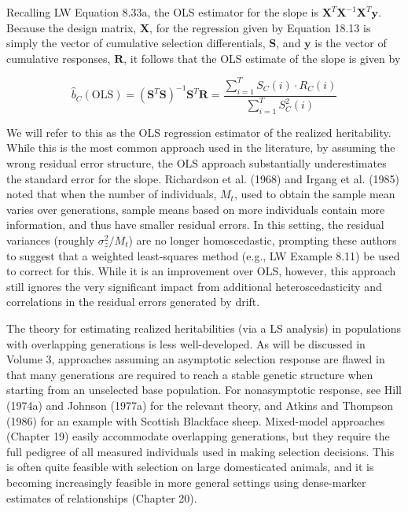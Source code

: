 \documentclass{article}
\begin{document}
Recalling LW Equation 8.33a, the OLS estimator for the slope is  $ \mathbf{X}^T\mathbf{X}^{-1}\mathbf{X}^T\mathbf{y} $. Because the design matrix,  $ \mathbf{X} $, for the regression given by Equation 18.13 is simply the vector of cumulative selection differentials,  $ \mathbf{S} $, and  $ \mathbf{y} $ is the vector of cumulative responses,  $ \mathbf{R} $, it follows that the OLS estimate of the slope is given by

\begin{equation}
\widehat{b}_{C}(\mathrm{OLS})=\left(\mathbf{S}^{T}\mathbf{S}\right)^{-1}\mathbf{S}^{T}\mathbf{R}=\frac{\sum_{i=1}^{T}S_{C}(i)\cdot R_{C}(i)}{\sum_{i=1}^{T}S_{C}^{2}(i)}
\tag{18.14}
\label{eq:18_14}
\end{equation}

We will refer to this as the OLS regression estimator of the realized heritability. While this is the most common approach used in the literature, by assuming the wrong residual error structure, the OLS approach substantially underestimates the standard error for the slope. Richardson et al. (1968) and Irgang et al. (1985) noted that when the number of individuals,  $ M_t $, used to obtain the sample mean varies over generations, sample means based on more individuals contain more information, and thus have smaller residual errors. In this setting, the residual variances (roughly  $ \sigma_z^2/M_t $) are no longer homoscedastic, prompting these authors to suggest that a weighted least-squares method (e.g., LW Example 8.11) be used to correct for this. While it is an improvement over OLS, however, this approach still ignores the very significant impact from additional heteroscedasticity and correlations in the residual errors generated by drift.

The theory for estimating realized heritabilities (via a LS analysis) in populations with overlapping generations is less well-developed. As will be discussed in Volume 3, approaches assuming an asymptotic selection response are flawed in that many generations are required to reach a stable genetic structure when starting from an unselected base population. For nonasymptotic response, see Hill (1974a) and Johnson (1977a) for the relevant theory, and Atkins and Thompson (1986) for an example with Scottish Blackface sheep. Mixed-model approaches (Chapter 19) easily accommodate overlapping generations, but they require the full pedigree of all measured individuals used in making selection decisions. This is often quite feasible with selection on large domesticated animals, and it is becoming increasingly feasible in more general settings using dense-marker estimates of relationships (Chapter 20).
\end{document}
